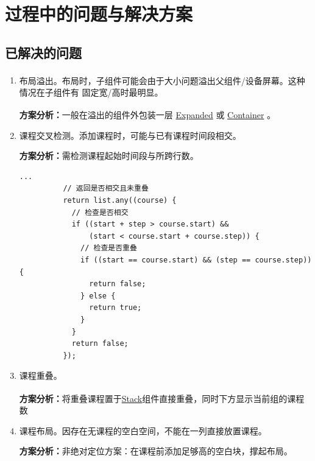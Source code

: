 \documentclass{article}
\begin{document}
\section{过程中的问题与解决方案}

  \subsection{已解决的问题}

    \begin{enumerate}
      \item 布局溢出\textsuperscript{\cite{ref:overflow}}。布局时，子组件可能会由于大小问题溢出父组件/设备屏幕。这种情况在子组件有
      固定宽/高时最明显。

        \textbf{方案分析：}一般在溢出的组件外包装一层 \uline{Expanded}\textsuperscript{\cite{ref:Expanded}} 或 \uline{Container}\textsuperscript{\cite{ref:Container}} 。

      \item 课程交叉检测。添加课程时，可能与已有课程时间段相交。

        \textbf{方案分析：}需检测课程起始时间段与所跨行数。

        \begin{lstlisting}[frame=shadowbox]
          ...
          // 返回是否相交且未重叠
          return list.any((course) {
            // 检查是否相交
            if ((start + step > course.start) &&
                (start < course.start + course.step)) {
              // 检查是否重叠
              if ((start == course.start) && (step == course.step)) {
                return false;
              } else {
                return true;
              }
            }
            return false;
          });
        \end{lstlisting}

      \item 课程重叠。

        \textbf{方案分析：}将重叠课程置于\uline{Stack}\textsuperscript{\cite{ref:Stack}}组件直接重叠，同时下方显示当前组的课程数

      \item 课程布局。因存在无课程的空白空间，不能在一列直接放置课程。

        \textbf{方案分析：}非绝对定位方案：在课程前添加足够高的空白块，撑起布局。


\end{enumerate}
\end{document}
